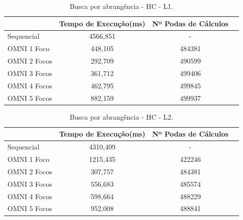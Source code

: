 \begin{table}[H]
    \centering
    \caption[Busca por abrangência - HC- L1]{Busca por abrangência - HC - L1.
    \label{tab:hc_range}}
   \begin{tabular}{l c c c}
        \toprule
            &Tempo de Execução(ms)&Nº Podas de Cálculos\\
        \midrule
            Sequencial & 4566,851 & - \\
            OMNI 1 Foco & 448,105 & 484381 \\
            OMNI 2 Focos & 292,709 & 490599 \\
            OMNI 3 Focos & 361,712& 499406 \\
            OMNI 4 Focos & 462,795 & 499845 \\
            OMNI 5 Focos & 882,159 & 499937 \\
        \bottomrule
    \end{tabular}
\end{table}

\begin{table}[H]
    \centering
    \caption[Busca por abrangência - HC- L2]{Busca por abrangência - HC - L2.
    \label{tab:hc_range2}}
   \begin{tabular}{l c c c}
        \toprule
            &Tempo de Execução(ms)&Nº Podas de Cálculos\\
        \midrule
            Sequencial & 4310,409 & - \\
            OMNI 1 Foco & 1215,435 & 422246 \\
            OMNI 2 Focos & 307,757 & 484381 \\
            OMNI 3 Focos & 556,683 & 485574 \\
            OMNI 4 Focos & 598,664 & 488229 \\
            OMNI 5 Focos & 952,008 & 488841 \\
        \bottomrule
    \end{tabular}
\end{table}

